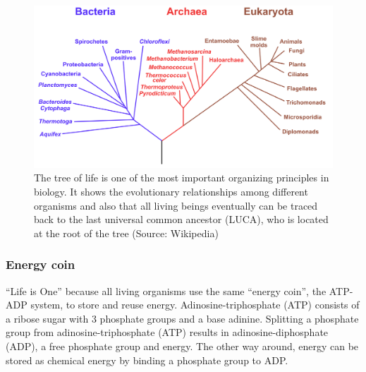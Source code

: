 \documentclass[
  11pt,
]{book}
\begin{document}
\begin{figure}

{\centering \includegraphics[width=0.8\linewidth]{./figs/Phylogenetic_tree} 

}

\caption{The tree of life is one of the most important organizing principles in biology. It shows the evolutionary relationships among different organisms and also that all living beings eventually can be traced back to the last universal common ancestor (LUCA), who is located at the root of the tree (Source: Wikipedia)}\label{fig:treeOfLife}
\end{figure}

\newpage

\hypertarget{sectionEnergyCoin}{%
\subsubsection{Energy coin}\label{sectionEnergyCoin}}

``Life is One'' because all living organisms use the same ``energy coin'', the ATP-ADP system, to store and reuse energy.
Adinosine-triphosphate (ATP) consists of a ribose sugar with 3 phosphate groups and a base adinine.
Splitting a phosphate group from adinosine-triphosphate (ATP) results in adinosine-diphosphate (ADP), a free phosphate group and energy.
The other way around, energy can be stored as chemical energy by binding a phosphate group to ADP.
\end{document}
